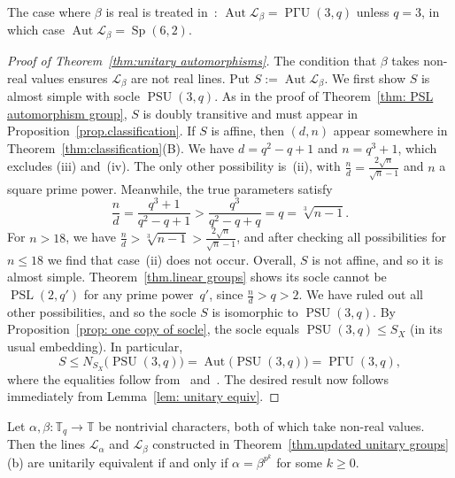 The case where $\beta$ is real is treated in~\cite{Taylor:92}: $\operatorname{Aut} \mathscr{L}_\beta = \operatorname{P\text{$\Gamma$}U}(3,q)$ unless $q=3$, in which case $\operatorname{Aut} \mathscr{L}_\beta = \operatorname{Sp}(6,2)$.

\begin{proof}[Proof of Theorem~\ref{thm:unitary automorphisms}]
The condition that $\beta$ takes non-real values ensures $\mathscr{L}_\beta$ are not real lines.
Put $S:= \operatorname{Aut} \mathscr{L}_\beta$.
We first show $S$ is almost simple with socle $\operatorname{PSU}(3,q)$.
As in the proof of Theorem~\ref{thm: PSL automorphism group}, $S$ is doubly transitive and must appear in Proposition~\ref{prop.classification}.
If $S$ is affine, then $(d,n)$ appear somewhere in Theorem~\ref{thm:classification}(B).
We have $d=q^2-q+1$ and $n=q^3+1$, which excludes (iii) and~(iv).
The only other possibility is~(ii), with $\frac{n}{d} = \frac{2\sqrt{n}}{\sqrt{n}-1}$ and $n$ a square prime power.
Meanwhile, the true parameters satisfy
\[
\frac{n}{d}=\frac{q^3+1}{q^2-q+1} > \frac{q^3}{q^2-q+q}=q=\sqrt[3]{n-1}.
\]
For $n > 18$, we have $\frac{n}{d} > \sqrt[3]{n-1} > \frac{2\sqrt{n}}{\sqrt{n}-1}$, and after checking all possibilities for $n \leq 18$ we find that case~(ii) does not occur.
Overall, $S$ is not affine, and so it is almost simple.
Theorem~\ref{thm.linear groups} shows its socle cannot be $\operatorname{PSL}(2,q')$ for any prime power~$q'$, since $\frac{n}{d} > q > 2$.
We have ruled out all other possibilities, and so the socle $S$ is isomorphic to $\operatorname{PSU}(3,q)$.
By Proposition~\ref{prop: one copy of socle}, the socle equals $\operatorname{PSU}(3,q)\leq S_X$ (in its usual embedding).
In particular,
\begin{equation}
\label{eq: PSU normalizer}
S \leq N_{S_X}\bigl( \operatorname{PSU}(3,q) \bigr) = \operatorname{Aut}\bigl( \operatorname{PSU}(3,q) \bigr) = \operatorname{P\text{$\Gamma$}U}(3,q),
\end{equation}
where the equalities follow from~\cite[Theorem~4.2A]{DixonMortimer:96} and~\cite[\S 3.6.3]{Wilson:09}.
The desired result now follows immediately from Lemma~\ref{lem: unitary equiv}.
\end{proof}


\begin{theorem}
\label{thm:unitary equivalences}
Let $\alpha,\beta \colon \mathbb{T}_q \to \mathbb{T}$ be nontrivial characters, both of which take non-real values.
Then the lines $\mathscr{L}_\alpha$ and $\mathscr{L}_\beta$ constructed in Theorem~\ref{thm.updated unitary groups}(b) are unitarily equivalent if and only if $\alpha = \beta^{p^k}$ for some $k \geq 0$.
\end{theorem}

